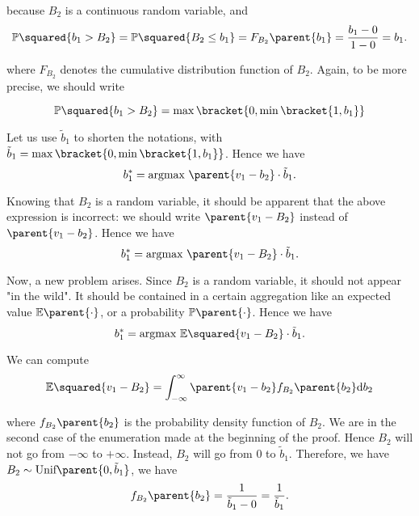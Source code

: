 because $B_2$ is a continuous random variable, and
\begin{equation*}
    \mathbb{P} \squared{b_1 > B_2}
    = \mathbb{P} \squared{B_2 \leq b_1}
    = F_{B_2} \parent{b_1}
    = \dfrac{b_1 - 0}{1 - 0}
    = b_1.
\end{equation*}


where $F_{B_2}$ denotes the cumulative distribution function of $B_{2}$. Again, to be more precise, we should write

\begin{equation*}
    \mathbb{P} \squared{b_1 > B_2} = \max \bracket{0, \min \bracket{1, b_1}}
\end{equation*}

Let us use $\tilde{b}_1$ to shorten the notations, with $\tilde{b}_1 = \max \bracket{0, \min \bracket{1, b_1}}$. Hence we have
\begin{equation*}
    b_1^{*}
    = \text{argmax} \ \parent{v_1 - b_2} \cdot \tilde{b}_1.
\end{equation*}

Knowing that $B_2$ is a random variable, it should be apparent that the above expression is incorrect: we should write $\parent{v_1 - B_2}$ instead of $\parent{v_1 - b_2}$. Hence we have
\begin{equation*}
    b_1^{*}
    = \text{argmax} \ \parent{v_1 - B_2} \cdot \tilde{b}_1.
\end{equation*}

Now, a new problem arises. Since $B_2$ is a random variable, it should not appear "in the wild". It should be contained in a certain aggregation like an expected value $\mathbb{E} \parent{\cdot}$, or a probability $\mathbb{P} \parent{\cdot}$. Hence we have
\begin{equation*}
    b_1^{*}
    = \text{argmax} \ \mathbb{E} \squared{v_1 - B_2} \cdot \tilde{b}_1.
\end{equation*}

We can compute
\begin{equation*}
    \mathbb{E} \squared{v_1 - B_2}
    = \int_{- \infty}^{\infty} \parent{v_1 - b_2} f_{B_2} \parent{b_2} \mathrm{d} b_2
\end{equation*}

where $f_{B_2} \parent{b_2}$ is the probability density function of $B_2$. We are in the second case of the enumeration made at the beginning of the proof. Hence $B_2$ will not go from $- \infty$ to $+ \infty$. Instead, $B_2$ will go from $0$ to $\tilde{b}_1$. Therefore, we have $B_2 \sim \text{Unif} \parent{0, \tilde{b}_1}$, we have
\begin{equation*}
    f_{B_2} \parent{b_2} = \dfrac{1}{\tilde{b}_1 - 0} = \dfrac{1}{\tilde{b}_1}.
\end{equation*}

